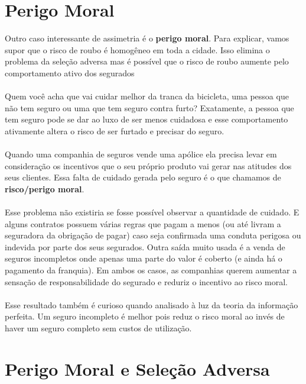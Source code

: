 \documentclass[a4paper,11pt,oneside]{book}
\theoremstyle{definition}
\theoremstyle{break}
\begin{document}
\section{Perigo Moral}

Outro caso interessante de assimetria é o \textbf{perigo moral}. Para explicar, vamos supor que o risco de roubo é homogêneo em toda a cidade. Isso elimina o problema da seleção adversa mas é possível que o risco de roubo aumente pelo comportamento ativo dos segurados
\\~\\
Quem você acha que vai cuidar melhor da tranca da bicicleta, uma pessoa que não tem seguro ou uma que tem seguro contra furto? Exatamente, a pessoa que tem seguro pode se dar ao luxo de ser menos cuidadosa e esse comportamento ativamente altera o risco de ser furtado e precisar do seguro.
\\~\\
Quando uma companhia de seguros vende uma apólice ela precisa levar em consideração os incentivos que o seu próprio produto vai gerar nas atitudes dos seus clientes. Essa falta de cuidado gerada pelo seguro é o que chamamos de \textbf{risco/perigo moral}.
\\~\\
Esse problema não existiria se fosse possível observar a quantidade de cuidado. E alguns contratos possuem várias regras que pagam a menos (ou até livram a seguradora da obrigação de pagar) caso seja confirmada uma conduta perigosa ou indevida por parte dos seus segurados. Outra saída muito usada é a venda de seguros incompletos onde apenas uma parte do valor é coberto (e ainda há o pagamento da franquia). Em ambos os casos, as companhias querem aumentar a sensação de responsabilidade do segurado e reduriz o incentivo ao risco moral.
\\~\\
Esse resultado também é curioso quando analisado à luz da teoria da informação perfeita. Um seguro incompleto é melhor pois reduz o risco moral ao invés de haver um seguro completo sem custos de utilização.

\section{Perigo Moral e Seleção Adversa}
\end{document}
